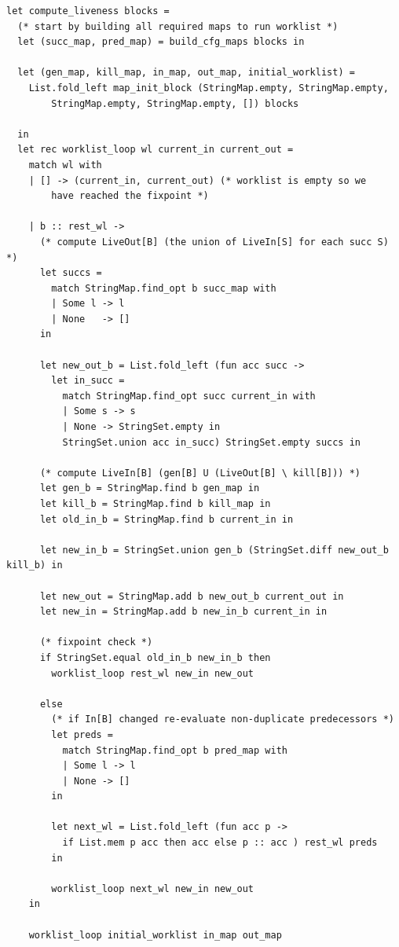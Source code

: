 \documentclass[11pt, a4paper]{article}
\begin{document}
\medskip

\begin{lstlisting}[language={[Objective]Caml}]
let compute_liveness blocks =
  (* start by building all required maps to run worklist *)
  let (succ_map, pred_map) = build_cfg_maps blocks in

  let (gen_map, kill_map, in_map, out_map, initial_worklist) =
    List.fold_left map_init_block (StringMap.empty, StringMap.empty, 
        StringMap.empty, StringMap.empty, []) blocks 
  
  in
  let rec worklist_loop wl current_in current_out =
    match wl with
    | [] -> (current_in, current_out) (* worklist is empty so we 
        have reached the fixpoint *)

    | b :: rest_wl ->
      (* compute LiveOut[B] (the union of LiveIn[S] for each succ S) *)
      let succs =
        match StringMap.find_opt b succ_map with
        | Some l -> l
        | None   -> []
      in

      let new_out_b = List.fold_left (fun acc succ ->
        let in_succ = 
          match StringMap.find_opt succ current_in with 
          | Some s -> s 
          | None -> StringSet.empty in
          StringSet.union acc in_succ) StringSet.empty succs in
      
      (* compute LiveIn[B] (gen[B] U (LiveOut[B] \ kill[B])) *)
      let gen_b = StringMap.find b gen_map in
      let kill_b = StringMap.find b kill_map in
      let old_in_b = StringMap.find b current_in in

      let new_in_b = StringSet.union gen_b (StringSet.diff new_out_b kill_b) in

      let new_out = StringMap.add b new_out_b current_out in
      let new_in = StringMap.add b new_in_b current_in in

      (* fixpoint check *)
      if StringSet.equal old_in_b new_in_b then
        worklist_loop rest_wl new_in new_out
      
      else
        (* if In[B] changed re-evaluate non-duplicate predecessors *)
        let preds =
          match StringMap.find_opt b pred_map with
          | Some l -> l
          | None -> []
        in

        let next_wl = List.fold_left (fun acc p ->
          if List.mem p acc then acc else p :: acc ) rest_wl preds
        in

        worklist_loop next_wl new_in new_out
    in

    worklist_loop initial_worklist in_map out_map
\end{lstlisting}
\end{document}
